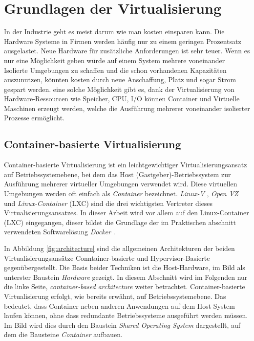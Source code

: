 \thispagestyle{empty}

\section{Grundlagen der Virtualisierung}

In der Industrie geht es meist darum wie man kosten einsparen kann. Die Hardware Systeme in Firmen werden häufig nur zu einem geringen Prozentsatz ausgelastet. Neue Hardware für zusätzliche Anforderungen ist sehr teuer. Wenn es nur eine Möglichkeit geben würde auf einem System mehrere voneinander Isolierte Umgebungen zu schaffen und die schon vorhandenen Kapazitäten auszunutzen, könnten kosten durch neue Anschaffung, Platz und sogar Strom gespart werden. eine solche Möglichkeit gibt es, dank der Virtualisierung von Hardware-Ressourcen wie Speicher, CPU, I/O können Container und Virtuelle Maschinen erzeugt werden, welche die Ausführung mehrerer voneinander isolierter Prozesse ermöglicht.

\pagebreak

\subsection{Container-basierte Virtualisierung}
Container-basierte Virtualisierung ist ein leichtgewichtiger Virtualisierungsansatz auf Betriebssystemebene, bei dem das Host (Gastgeber)-Betriebssystem zur Ausführung mehrerer virtueller Umgebungen verwendet wird. Diese virtuellen Umgebungen werden oft einfach als \emph{Container} bezeichnet. \emph{Linux-V} \cite{Overview2018PaperLinux-VServer}, \emph{Open VZ} \cite{IndexOpenvz.org} und \emph{Linux-Container} (LXC) \cite{IndexLinuxcontainers.Org} sind die drei wichtigsten Vertreter dieses Virtualisierungsansatzes. In dieser Arbeit wird vor allem auf den Linux-Container (LXC) eingegangen, dieser bildet die Grundlage der im Praktischen abschnitt verwendeten Softwarelösung \emph{Docker} \cite{MeineDockerPlatform}. 

In Abbildung \ref{fig:architecture} sind die allgemeinen Architekturen der beiden Virtualisierungsansätze Conntainer-basierte und Hypervisor-Basierte gegenübergestellt. Die Basis beider Techniken ist die Host-Hardware, im Bild als unterster Baustein \emph{Hardware} gezeigt. In diesem Abschnitt wird im Folgenden nur die linke Seite, \emph{container-based architecture} weiter betrachtet. Container-basierte Virtualisierung erfolgt, wie bereits erwähnt, auf Betriebssystemebene. Das bedeutet, dass Container neben anderen Anwendungen auf dem Host-System laufen können, ohne dass redundante Betriebssysteme ausgeführt werden müssen. Im Bild wird dies durch den Baustein \emph{Shared Operating System} dargestellt, auf dem die Bausteine \emph{Container} aufbauen. 

